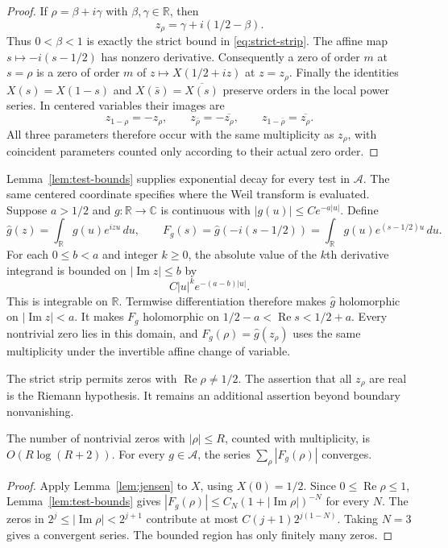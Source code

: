 \documentclass[11pt]{article}
\numberwithin{equation}{section}
\newcommand{\R}{\mathbb R}
\newcommand{\C}{\mathbb C}
\newcommand{\A}{\mathcal A}
\begin{document}
\begin{proof}
If $\rho=\beta+i\gamma$ with $\beta,\gamma\in\R$, then
\[
 z_\rho=\gamma+i(1/2-\beta).
\]
Thus $0<\beta<1$ is exactly the strict bound in
\eqref{eq:strict-strip}.
The affine map $s\mapsto-i(s-1/2)$ has nonzero derivative.
Consequently a zero of order $m$ at $s=\rho$ is a zero of order $m$
of $z\mapsto X(1/2+iz)$ at $z=z_\rho$.
Finally the identities $X(s)=X(1-s)$ and
$X(\bar s)=\overline{X(s)}$ preserve orders in the local power series.
In centered variables their images are
\[
 z_{1-\rho}=-z_\rho,\qquad
 z_{\bar\rho}=-\overline{z_\rho},\qquad
 z_{1-\bar\rho}=\overline{z_\rho}.
\]
All three parameters therefore occur with the same multiplicity as
$z_\rho$, with coincident parameters counted only according to their
actual zero order.
\end{proof}

Lemma~\ref{lem:test-bounds} supplies exponential decay for every test in $\A$.
The same centered coordinate specifies where the Weil transform is
evaluated.  Suppose $a>1/2$ and $g:\R\to\C$ is continuous with
$|g(u)|\leq C e^{-a|u|}$.
Define
\[
 \widehat g(z)=\int_{\R}g(u)e^{izu}\,du,
 \qquad
 F_g(s)=\widehat g(-i(s-1/2))
       =\int_{\R}g(u)e^{(s-1/2)u}\,du.
\]
For each $0\leq b<a$ and integer $k\geq0$, the absolute value of the
$k$th derivative integrand is bounded on $|\operatorname{Im}z|\leq b$ by
\[
 C|u|^k e^{-(a-b)|u|}.
\]
This is integrable on $\R$.
Termwise differentiation therefore makes $\widehat g$ holomorphic on
$|\operatorname{Im}z|<a$.
It makes $F_g$ holomorphic on
$1/2-a<\operatorname{Re}s<1/2+a$.
Every nontrivial zero lies in this domain, and
$F_g(\rho)=\widehat g(z_\rho)$ uses the same multiplicity under the
invertible affine change of variable.

The strict strip permits zeros with $\operatorname{Re}\rho\ne1/2$.
The assertion that all $z_\rho$ are real is the Riemann hypothesis.
It remains an additional assertion beyond boundary nonvanishing.

\begin{corollary}
\label{cor:zero-count}
The number of nontrivial zeros with $|\rho|\leq R$, counted with multiplicity,
is $O(R\log(R+2))$.
For every $g\in\A$, the series $\sum_\rho|F_g(\rho)|$ converges.
\end{corollary}

\begin{proof}
Apply Lemma~\ref{lem:jensen} to $X$, using $X(0)=1/2$.
Since $0\leq\operatorname{Re}\rho\leq1$, Lemma~\ref{lem:test-bounds}
gives $|F_g(\rho)|\leq C_N(1+|\operatorname{Im}\rho|)^{-N}$ for every $N$.
The zeros in $2^j\leq|\operatorname{Im}\rho|<2^{j+1}$ contribute at most
$C(j+1)2^{j(1-N)}$.  Taking $N=3$ gives a convergent series.
The bounded region has only finitely many zeros.
\end{proof}
\end{document}
